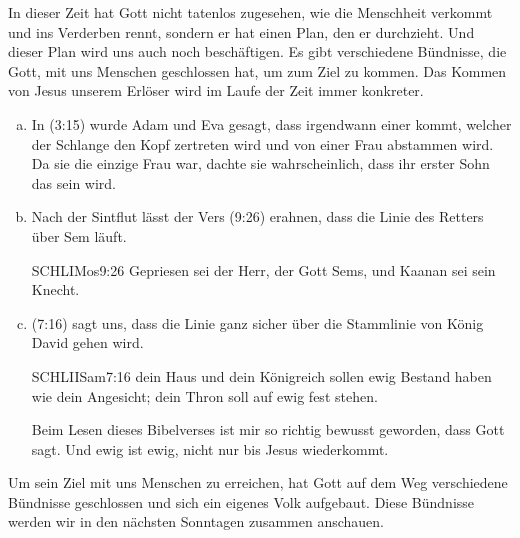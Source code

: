         In dieser Zeit hat Gott nicht tatenlos zugesehen, wie die Menschheit verkommt und ins Verderben rennt, sondern er hat einen Plan, den er durchzieht. Und dieser Plan wird uns auch noch beschäftigen. Es gibt verschiedene Bündnisse, die Gott, mit uns Menschen geschlossen hat, um zum Ziel zu kommen. Das Kommen von Jesus unserem Erlöser wird im Laufe der Zeit immer konkreter.
        \begin{enumerate}[a)]
            \item In (3:15) wurde Adam und Eva gesagt, dass irgendwann einer kommt, welcher der Schlange den Kopf zertreten wird und von einer Frau abstammen wird. Da sie die einzige Frau war, dachte sie wahrscheinlich, dass ihr erster Sohn das sein wird.
            \item Nach der Sintflut lässt der Vers (9:26) erahnen, dass die Linie des Retters über Sem läuft.
            \begin{bibelquote}{SCHL}{IMos}{9:26}
                Gepriesen sei der Herr, der Gott Sems, und Kaanan sei sein Knecht.
            \end{bibelquote}
            \item {}(7:16) sagt uns, dass die Linie ganz sicher über die Stammlinie von König David gehen wird.
            \begin{bibelquote}{SCHL}{IISam}{7:16}
                dein Haus und dein Königreich sollen ewig Bestand haben wie dein Angesicht; dein Thron soll auf ewig fest stehen.
            \end{bibelquote}
            Beim Lesen dieses Bibelverses ist mir so richtig bewusst geworden, dass Gott  sagt. Und ewig ist ewig, nicht nur bis Jesus wiederkommt. 
        \end{enumerate}
        Um sein Ziel mit uns Menschen zu erreichen, hat Gott auf dem Weg verschiedene Bündnisse geschlossen und sich ein eigenes Volk aufgebaut. Diese Bündnisse werden wir in den nächsten Sonntagen zusammen anschauen.        
   
